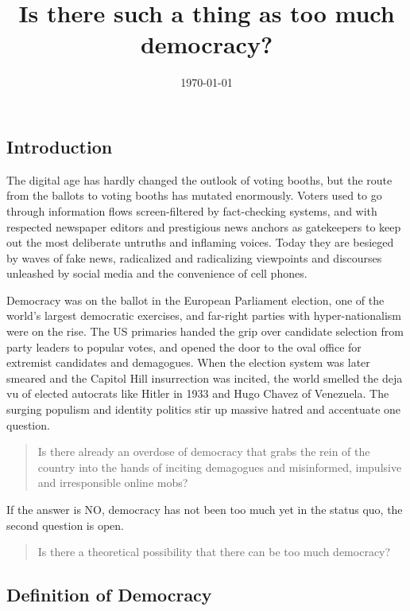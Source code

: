 \documentclass{scrartcl}
\begin{document}
\title{Is there such a thing as too much democracy?}
\author{\today}
\maketitle

\subsection*{Introduction}

The digital age has hardly changed the outlook of voting booths, but
the route from the ballots to voting booths has mutated enormously.
Voters used to go through information flows screen-filtered by fact-checking
systems, and with respected newspaper editors and prestigious news
anchors as gatekeepers to keep out the most deliberate untruths and
inflaming voices. Today they are besieged by waves of fake news, radicalized
and radicalizing viewpoints and discourses unleashed by social media
and the convenience of cell phones.

Democracy was on the ballot in the European Parliament election, one of the
world’s largest democratic exercises, and far-right parties with
hyper-nationalism were on the rise. The US primaries handed the grip over
candidate selection from party leaders to popular votes, and opened the door to
the oval office for extremist candidates and demagogues. When the election
system was later smeared and the Capitol Hill insurrection was incited, the
world smelled the deja vu of elected autocrats like Hitler in 1933 and Hugo
Chavez of Venezuela. The surging populism and identity politics stir up massive
hatred and accentuate one question.


\begin{quote}
Is there already an overdose of democracy that grabs the rein of the
country into the hands of inciting demagogues and misinformed, impulsive
and irresponsible online mobs? 
\end{quote}
If the answer is NO, democracy has not been too much yet in the status
quo, the second question is open.
\begin{quote}
Is there a theoretical possibility that there can be too much democracy? 
\end{quote}

\subsection*{Definition of Democracy}
\end{document}
